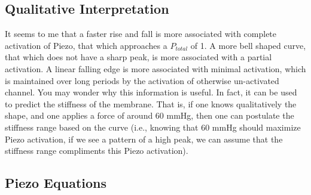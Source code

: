 \documentclass[12pt]{amsart}
\begin{document}
\subsection{Qualitative Interpretation} It seems to me that a faster rise and fall is more associated with complete activation of Piezo, that which approaches a $P_{total}$ of 1. A more bell shaped curve, that which does not have a sharp peak, is more associated with a partial activation. A linear falling edge is more associated with minimal activation, which is maintained over long periods by the activation of otherwise un-activated channel. You may wonder why this information is useful. In fact, it can be used to predict the stiffness of the membrane. That is, if one knows qualitatively the shape, and one applies a force of around  60 mmHg, then one can postulate the stiffness range based on the curve (i.e., knowing that 60 mmHg should maximize Piezo activation, if we see a pattern of a high peak, we can assume that the stiffness range compliments this Piezo activation). 


\subsection{Piezo Equations}

\begin{center}
\end{center}
\end{document}
